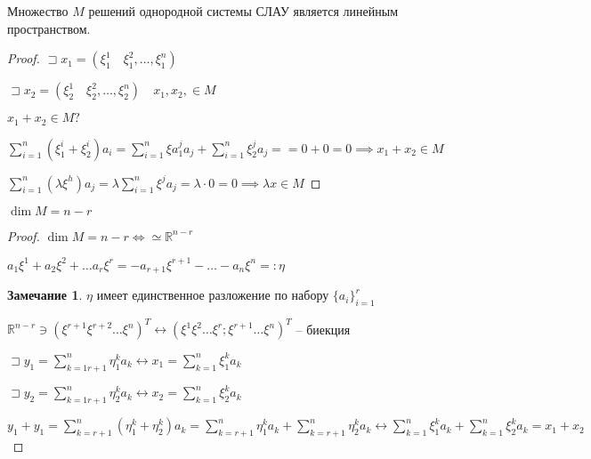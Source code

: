 \documentclass{book}
\newcommand\R{\ensuremath{\mathbb{R}}}
\theoremstyle{definition}
\newtheorem*{note}{Замечание}
\begin{document}
\begin{enumerate}
         \begin{theorem}
             Множество $M$ решений однородной системы СЛАУ является линейным пространством.

         \end{theorem}
         \begin{proof}
             
             $\sqsupset x_1 = \left( \xi_1^1\quad \xi_1^2, \ldots, \xi_1^n \right) $ 

             $\sqsupset x_2 =\left( \xi_2^1\quad \xi_2^2, \ldots, \xi_2^n \right)\quad x_1, x_2, \in M $

             $x_1+x_2\in M?$

             $\sum_{i=1}^{n} \left( \xi_1^i + \xi_2^i \right) a_i = \sum_{i=1}^{n} \xi a_1^ja_j + \sum_{i=1}^{n} \xi_2^ja_j = =0+0 = 0 \implies x_1+x_2\in M$

             $\sum_{i=1}^{n} (\lambda \xi^h)a_j = \lambda \sum_{i=1}^{n} \xi^ja_j = \lambda\cdot 0 = 0 \implies \lambda x\in M$
         \end{proof}

         \begin{theorem}
             $\dim M = n - r$
         \end{theorem}
         \begin{proof}
             $\dim M = n-r \iff   \simeq \R^{n-r}$

             $a_1\xi^1 + a_2\xi^2 + \ldots a_r\xi^r = -a_{r+1}\xi^{r+1} - \ldots - a_n\xi^n =: \eta$

             \begin{note}
                 $\eta$ имеет единственное разложение по набору  $\{a_i\}_{i=1}^r$
             \end{note}

             $\R^{n-r} \ni \left( \xi^{r+1}\xi^{r+2} \ldots \xi^n \right)^T \longleftrightarrow \left( \xi^1\xi^2\ldots\xi^r;\xi^{r+1}\ldots\xi^n \right) ^T$ -- биекция

             $\sqsupset y_1 = \sum_{k=1r+1}^{n} \eta_1^ka_k \longleftrightarrow x_1 = \sum_{k=1}^{n} \xi_1^ka_k$ 

             $\sqsupset y_2 = \sum_{k=1r+1}^{n} \eta_2^ka_k \longleftrightarrow x_2 = \sum_{k=1}^{n} \xi_2^ka_k$ 

             $y_1+y_1 = \sum_{k=r+1}^{n} \left( \eta_1^k+\eta_2^k \right) a_k = \sum_{k=r+1}^{n} \eta_1^ka_k + \sum_{k=r+1}^{n} \eta_2^ka_k \longleftrightarrow \sum_{k=1}^{n} \xi_1^ka_k + \sum_{k=1}^{n} \xi_2^ka_k = x_1+x_2$ 


\end{proof}
\end{enumerate}
\end{document}
